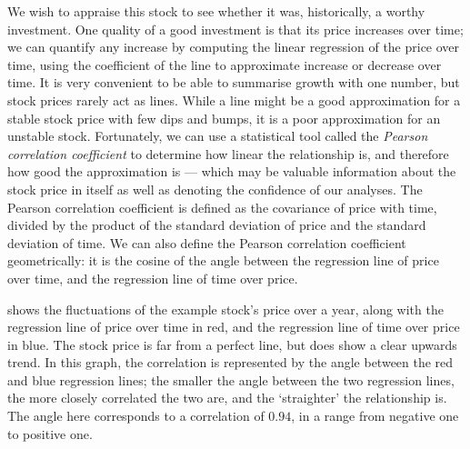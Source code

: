 We wish to appraise this stock to see whether it was, historically, a worthy investment.
One quality of a good investment is that its price increases over time; we can quantify any increase by computing the linear regression of the price over time, using the coefficient of the line to approximate increase or decrease over time.
It is very convenient to be able to summarise growth with one number, but stock prices rarely act as lines.
While a line might be a good approximation for a stable stock price with few dips and bumps, it is a poor approximation for an unstable stock.
Fortunately, we can use a statistical tool called the \emph{Pearson correlation coefficient} to determine how linear the relationship is, and therefore how good the approximation is --- which may be valuable information about the stock price in itself as well as denoting the confidence of our analyses.
The Pearson correlation coefficient is defined as the covariance of price with time, divided by the product of the standard deviation of price and the standard deviation of time.
We can also define the Pearson correlation coefficient geometrically: it is the cosine of the angle between the regression line of price over time, and the regression line of time over price.



 shows the fluctuations of the example stock's price over a year, along with the regression line of price over time in red, and the regression line of time over price in blue.
The stock price is far from a perfect line, but does show a clear upwards trend.
In this graph, the correlation is represented by the angle between the red and blue regression lines; the smaller the angle between the two regression lines, the more closely correlated the two are, and the `straighter' the relationship is.
The angle here corresponds to a correlation of $0.94$, in a range from negative one to positive one.


